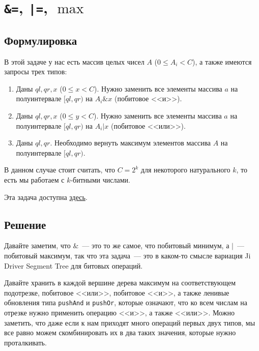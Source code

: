 \cprotect \section{\verb+&=+, \verb^|=^, $\max$}

\subsection{Формулировка}

В этой задаче у нас есть массив целых чисел $A$ ($0 \le A_i < C$), а также имеются запросы трех типов:

\begin{enumerate}
    \item Даны $ql, qr, x$ ($0 \le x < C$). Нужно заменить все элементы массива $a$ на полуинтервале $[ql, qr)$ на $A_i \& x$ (побитовое <<и>>).
    \item Даны $ql, qr, x$ ($0 \le y < C$). Нужно заменить все элементы массива $a$ на полуинтервале $[ql, qr)$ на $A_i | x$ (побитовое <<или>>).
    \item Даны $ql, qr$. Необходимо вернуть максимум элементов массива $A$ на полуинтервале $[ql, qr)$.
\end{enumerate}

В данном случае стоит считать, что $C = 2^k$ для некоторого натурального $k$, то есть мы работаем с $k$-битными числами.

Эта задача доступна \href{https://csacademy.com/contest/round-70/task/and-or-max/}{здесь}.

\subsection{Решение}

Давайте заметим, что $\&$~--- это то же самое, что побитовый минимум, а $|$~--- побитовый максимум, так что эта задача~--- это в каком-то смысле вариация Ji Driver Segment Tree для битовых операций.

Давайте хранить в каждой вершине дерева максимум на соответствующем подотрезке, побитовое <<или>>, побитовое <<и>>, а также ленивые обновления типа \verb+pushAnd+ и \verb+pushOr+, которые означают, что ко всем числам на отрезке нужно применить операцию <<и>>, а также <<или>>. Можно заметить, что даже если к нам приходят много операций первых двух типов, мы все равно можем скомбинировать их в два таких значения, которые нужно проталкивать.

